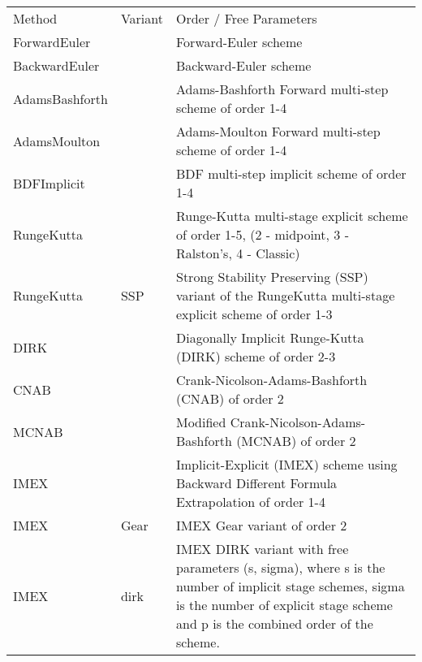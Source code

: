 \begin{center}
\footnotesize
\begin{tabular}{p{2.5cm}p{1cm}p{10cm}}
\toprule
Method         & Variant & Order / Free Parameters \\
ForwardEuler   &      & Forward-Euler scheme\\
BackwardEuler  &      & Backward-Euler scheme\\

AdamsBashforth &      & Adams-Bashforth Forward multi-step scheme of order 1-4\\

AdamsMoulton   &      & Adams-Moulton Forward multi-step scheme of order 1-4\\

BDFImplicit    &      & BDF multi-step implicit scheme of order 1-4\\

RungeKutta     &      & Runge-Kutta multi-stage explicit scheme of
                        order 1-5, (2 - midpoint, 3 - Ralston's, 4 - Classic)\\

RungeKutta     & SSP  & Strong Stability Preserving (SSP) variant of
                        the RungeKutta multi-stage explicit scheme of
                        order 1-3\\

DIRK           &      & Diagonally Implicit Runge-Kutta (DIRK) scheme of
                        order 2-3\\

CNAB           &      & Crank-Nicolson-Adams-Bashforth (CNAB) of order 2\\

MCNAB          &      & Modified Crank-Nicolson-Adams-Bashforth (MCNAB)
                        of order 2\\

IMEX           &      & Implicit-Explicit (IMEX) scheme using Backward
                        Different Formula Extrapolation of order 1-4\\

IMEX           & Gear & IMEX Gear variant of order 2\\

IMEX           & dirk & IMEX DIRK variant with free parameters (s, sigma), 
                        where s is the number of implicit stage schemes,
                        sigma is the number of explicit stage scheme and
                        p is the combined order of the scheme.\\


\end{tabular}
\end{center}
